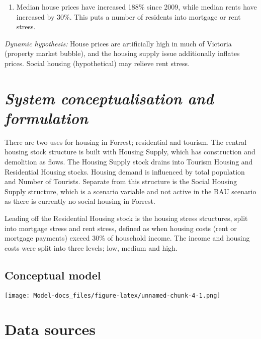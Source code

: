 \documentclass[
  11pt,
]{book}
\providecommand{\tightlist}{%
  \setlength{\itemsep}{0pt}\setlength{\parskip}{0pt}}
\begin{document}
\begin{enumerate}
\def\labelenumi{\arabic{enumi}.}
\setcounter{enumi}{2}
\tightlist
\item
  Median house prices have increased 188\% since 2009, while median rents have increased by 30\%. This puts a number of residents into mortgage or rent stress.
\end{enumerate}

\emph{Dynamic hypothesis:}
House prices are artificially high in much of Victoria (property market bubble), and the housing supply issue additionally inflates prices. Social housing (hypothetical) may relieve rent stress.

\hypertarget{system-conceptualisation-and-formulation}{%
\section{\texorpdfstring{\emph{System conceptualisation and formulation}}{System conceptualisation and formulation}}\label{system-conceptualisation-and-formulation}}

There are two uses for housing in Forrest; residential and tourism. The central housing stock structure is built with Housing Supply, which has construction and demolition as flows. The Housing Supply stock drains into Tourism Housing and Residential Housing stocks. Housing demand is influenced by total population and Number of Tourists. Separate from this structure is the Social Housing Supply structure, which is a scenario variable and not active in the BAU scenario as there is currently no social housing in Forrest.

Leading off the Residential Housing stock is the housing stress structures, split into mortgage stress and rent stress, defined as when housing costs (rent or mortgage payments) exceed 30\% of household income. The income and housing costs were split into three levels; low, medium and high.

\hypertarget{conceptual-model-2}{%
\subsection{Conceptual model}\label{conceptual-model-2}}

\texttt{[image: Model-docs\_files/figure-latex/unnamed-chunk-4-1.png]}

\hypertarget{data-sources-2}{%
\section{Data sources}\label{data-sources-2}}
\end{document}
